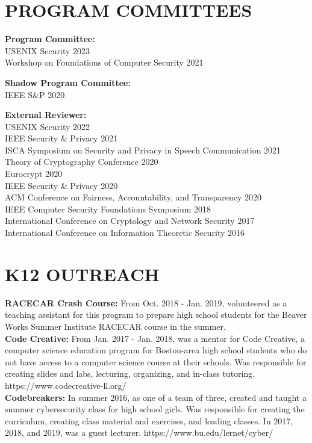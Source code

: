 \documentclass{res}
\begin{document}
\begin{resume}
\section{PROGRAM COMMITTEES}
\vspace{0.1in}

\textbf{Program Committee:} \\
USENIX Security 2023 \\
Workshop on Foundations of Computer Security 2021

\textbf{Shadow Program Committee:} \\
IEEE S\&P 2020

\textbf{External Reviewer:} \\
USENIX Security 2022 \\
IEEE Security \& Privacy 2021 \\
ISCA Symposium on Security and Privacy in Speech Communication 2021 \\
Theory of Cryptography Conference 2020 \\
Eurocrypt 2020 \\
IEEE Security \& Privacy 2020 \\
ACM Conference on Fairness, Accountability, and Transparency 2020 \\
IEEE Computer Security Foundations Symposium 2018 \\
International Conference on Cryptology and Network Security 2017 \\
International Conference on Information Theoretic Security 2016

\vspace{0.25in}


\section{K12 OUTREACH}
\vspace{0.1in}

\textbf{RACECAR Crash Course:} From Oct. 2018 - Jan. 2019, volunteered as a teaching assistant for
this program to prepare high school students for the Beaver Works Summer Institute RACECAR course in the summer. \\
\textbf{Code Creative:} From Jan. 2017 - Jan. 2018, was a mentor for Code Creative, a computer science education
program for Boston-area high school students who do not have access to a computer science course at their schools.
Was responsible for creating slides and labs, lecturing, organizing, and in-class tutoring.
https://www.codecreative-ll.org/ \\
\textbf{Codebreakers:} In summer 2016, as one of a team of three, created and taught a summer cybersecurity class for
high school girls.  Was responsible for creating the curriculum, creating class material and exercises, and leading
classes.  In 2017, 2018, and 2019, was a guest lecturer.  https://www.bu.edu/lernet/cyber/ \\



\end{resume}
\end{document}
